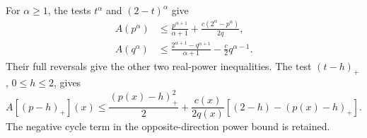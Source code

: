 For $\alpha\ge1$, the tests $t^\alpha$ and $(2-t)^\alpha$ give
\begin{align*}
 A(p^\alpha)&\le\frac{p^{\alpha+1}}{\alpha+1}
                  +\frac{c(2^\alpha-p^\alpha)}{2q},\\
 A(q^\alpha)&\le\frac{2^{\alpha+1}-q^{\alpha+1}}{\alpha+1}
                  -\frac c2q^{\alpha-1}.
\end{align*}
Their full reversals give the other two real-power inequalities.
The test $(t-h)_+$, $0\le h\le2$, gives
\[
 A[(p-h)_+](x)\le\frac{(p(x)-h)_+^2}{2}
 +\frac{c(x)}{2q(x)}[(2-h)-(p(x)-h)_+].
\]
The negative cycle term in the opposite-direction power bound is retained.

